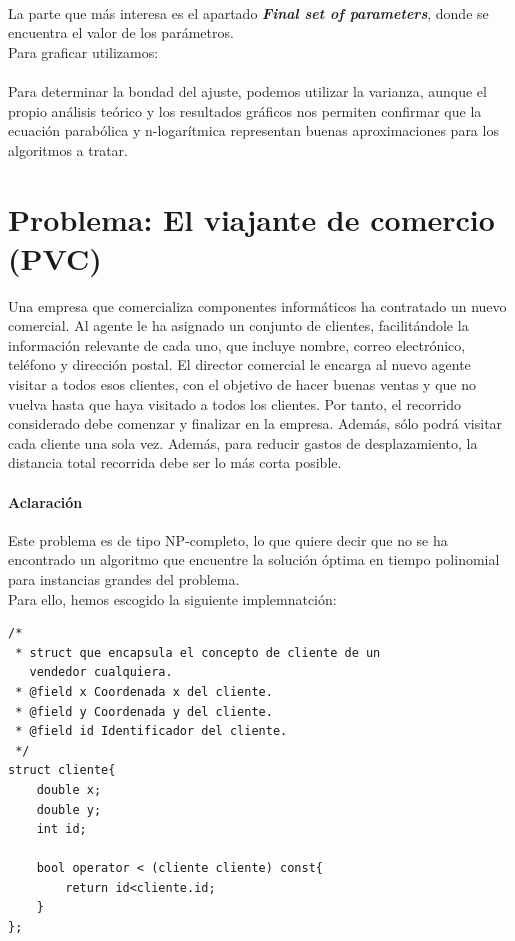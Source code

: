 \documentclass[a4paper,12pt,twoside]{article} %
\begin{document}
\\

La parte que más interesa es el apartado \textit{\textbf{Final set of parameters}}, donde se encuentra el valor de los parámetros.\\

Para graficar utilizamos:\\

\\

Para determinar la bondad del ajuste, podemos utilizar la varianza, aunque el propio análisis teórico y los resultados gráficos nos permiten confirmar que la ecuación parabólica y n-logarítmica representan buenas aproximaciones para los algoritmos a tratar.

\newpage

\section{Problema: El viajante de comercio (PVC)}

Una empresa que comercializa componentes informáticos ha contratado un nuevo comercial. Al agente le ha asignado un conjunto de clientes, facilitándole la información relevante de cada uno, que incluye nombre, correo electrónico, teléfono y dirección postal. El director comercial le encarga al nuevo agente visitar a todos esos clientes, con el objetivo de hacer buenas ventas y que no vuelva hasta que haya visitado a todos los clientes. Por tanto, el recorrido considerado debe comenzar y finalizar en la empresa. Además, sólo podrá visitar cada cliente una sola vez. Además, para reducir gastos de desplazamiento, la distancia total recorrida debe ser lo más corta posible.


\paragraph{Aclaración}
Este problema es de tipo NP-completo, lo que quiere decir que no se ha encontrado un algoritmo que encuentre la solución óptima en tiempo polinomial para instancias grandes del problema.\\

Para ello, hemos escogido la siguiente implemnatción:


\lstset{language=C++}
\begin{lstlisting}
/*
 * struct que encapsula el concepto de cliente de un 
   vendedor cualquiera.
 * @field x Coordenada x del cliente.
 * @field y Coordenada y del cliente.
 * @field id Identificador del cliente.
 */
struct cliente{
    double x;
    double y;
    int id;

    bool operator < (cliente cliente) const{
        return id<cliente.id;
    }
};


\end{lstlisting}
\newpage
\end{document}
